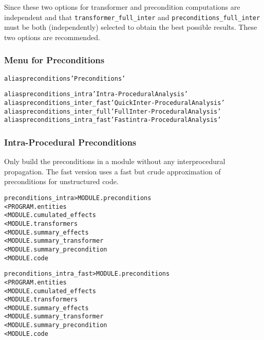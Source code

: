 \documentclass[a4paper]{report}
\newenvironment{PipsMake}{\begin{alltt}}{\end{alltt}}
\begin{document}
Since these two options for transformer and precondition computations are
independent and that \verb/transformer_full_inter/ and
\verb/preconditions_full_inter/ must be both (independently) selected
to obtain the best possible results. These two options are recommended.


\subsubsection{Menu for Preconditions}

\begin{PipsMake}
alias preconditions 'Preconditions'

alias preconditions_intra 'Intra-Procedural Analysis'
alias preconditions_inter_fast 'Quick Inter-Procedural Analysis'
alias preconditions_inter_full 'Full Inter-Procedural Analysis'
alias preconditions_intra_fast 'Fast intra-Procedural Analysis'
\end{PipsMake}

\subsubsection{Intra-Procedural Preconditions}

Only build the preconditions in a module without any interprocedural
propagation. The fast version uses a fast but crude approximation of
preconditions for unstructured code.

\begin{PipsMake}
preconditions_intra            > MODULE.preconditions
        < PROGRAM.entities
        < MODULE.cumulated_effects
        < MODULE.transformers
        < MODULE.summary_effects
        < MODULE.summary_transformer
        < MODULE.summary_precondition
        < MODULE.code
\end{PipsMake}

\begin{PipsMake}
preconditions_intra_fast            > MODULE.preconditions
        < PROGRAM.entities
        < MODULE.cumulated_effects
        < MODULE.transformers
        < MODULE.summary_effects
        < MODULE.summary_transformer
        < MODULE.summary_precondition
        < MODULE.code
\end{PipsMake}
\end{document}
